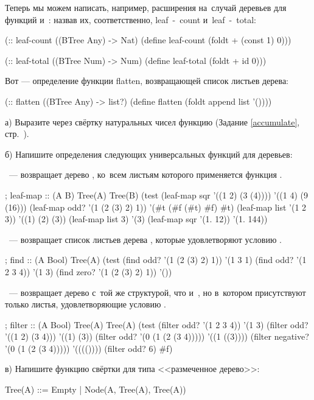 Теперь мы можем написать, например, расширения на~случай деревьев для функций  и~: назвав их, соответственно, \si{leaf-count} и~\si{leaf-total}:

\begin{SchemeCode}
(:: leaf-count ((BTree Any) -> Nat)
 (define leaf-count 
   (foldt + (const 1) 0)))

(:: leaf-total ((BTree Num) -> Num)
 (define leaf-total 
   (foldt + id 0)))
\end{SchemeCode}

Вот --- определение функции \si{flatten}, возвращающей список листьев дерева:
\begin{SchemeCode}
(:: flatten ((BTree Any) -> list?)
 (define flatten 
   (foldt append list '())))
\end{SchemeCode}

\newpage
\begin{Assignment}
а) Выразите через свёртку натуральных чисел  функцию  (Задание \ref{accumulate}, стр.~\pageref{accumulate}).

б) Напишите определения следующих универсальных функций для деревьев:

 ~--- возвращает дерево , ко~всем листьям которого применяется функция .
\begin{Specification}
; leaf-map :: (A \arrow B) Tree(A) \arrow Tree(B)
(test 
  (leaf-map sqr '((1 2) (3 (4))))  '((1 4) (9 (16)))
  (leaf-map odd? '(1 (2 (3) 2) 1)) '(#t (#f (#t) #f) #t)
  (leaf-map list '(1 2 3))         '((1) (2) (3))
  (leaf-map list 3)                '(3)
  (leaf-map sqr '(1. 12))          '(1. 144))
\end{Specification}

 ~--- возвращает список листьев дерева , которые удовлетворяют условию .
\begin{Specification}
; find :: (A \arrow Bool) Tree(A) \arrow [A]
(test 
  (find odd? '(1 (2 (3) 2) 1))   '(1 3 1)
  (find odd? '(1 2 3 4))         '(1 3)
  (find zero? '(1 (2 (3) 2) 1))  '())
\end{Specification}

~--- возвращает дерево с~той же структурой, что и~, но в~котором присутствуют только листья, удовлетворяющие условию .
\begin{Specification}
; filter :: (A \arrow Bool) Tree(A) \arrow Tree(A)
(test 
  (filter odd? '(1 2 3 4))              '(1 3)
  (filter odd? '((1 2) (3 4)))          '((1) (3))
  (filter odd? '(0 (1 (2 (3 4)))))      '((1 ((3))))
  (filter negative? '(0 (1 (2 (3 4))))) '(((())))
  (filter odd? 6)  #f)
\end{Specification}

в) Напишите функцию свёртки для типа <<размеченное дерево>>:
\begin{SchemeCode}
    Tree(A) ::= Empty
             |  Node(A, Tree(A), Tree(A))
\end{SchemeCode}
\end{Assignment}


